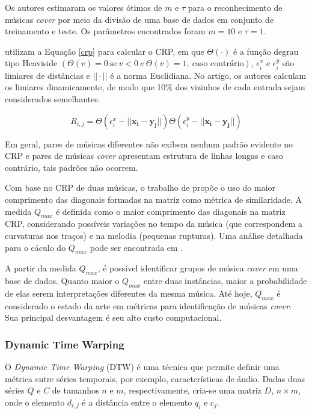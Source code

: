 Os autores estimaram os valores ótimos de \({m}\) e \({\tau}\) para o reconhecimento de músicas \textit{cover} por meio da divisão de uma base de dados em conjunto de treinamento e teste. Os parâmetros encontrados foram \({m = 10}\) e \({\tau = 1}\).

 utilizam a Equação \ref{crp} para calcular o CRP, em que \({\Theta(\cdot)}\) é a função degrau tipo Heaviside \({(\Theta(v) = 0 \ \textrm{se} \ v < 0 \  e \  \Theta(v) = 1, \ \textrm{caso contrário})}\), \({\epsilon_{i}^{x}}\) e \({\epsilon_{i}^{y}}\) são limiares de distâncias e \({|| \cdot ||}\) é a norma Euclidiana. No artigo, os autores calculam os limiares dinamicamente, de modo que 10\% dos vizinhos de cada entrada sejam considerados semelhantes.

\begin{equation} \label{crp}
    R_{i,j} = \Theta(\epsilon_{i}^{x} - ||\mathbf{x_{i} - y_{j}}||)\Theta(\epsilon_{i}^{y} - ||\mathbf{x_{i} - y_{j}}||)
\end{equation}

Em geral, pares de músicas diferentes não exibem nenhum padrão evidente no CRP e pares de músicas \textit{cover} apresentam estrutura de linhas longas e caso contrário, tais padrões não ocorrem.

Com base no CRP de duas músicas, o trabalho de  propõe o uso do maior comprimento das diagonais formadas na matriz como métrica de similaridade. A medida \({Q_{max}}\) é definida como o maior comprimento das diagonais na matriz CRP, considerando possíveis variações no tempo da música (que correspondem a curvaturas nos traços) e na melodia (pequenas rupturas). Uma análise detalhada para o cáculo do \({Q_{max}}\) pode ser encontrada em \cite{serra2009}.

A partir da medida \({Q_{max}}\), é possível identificar grupos de música \textit{cover} em uma base de dados. Quanto maior o \({Q_{max}}\) entre duas instâncias, maior a probabilidade de elas serem interpretações diferentes da mesma música. Até hoje, \({Q_{max}}\) é considerado o estado da arte em métricas para identificação de músicas \textit{cover}. Sua principal desvantagem é seu alto custo computacional.

\subsubsection{Dynamic Time Warping}

O \textit{Dynamic Time Warping} (DTW) \cite{keogh2004} é uma técnica que permite definir uma métrica entre séries temporais, por exemplo, características de áudio. Dadas duas séries \({Q}\) e \({C}\) de tamanhos \({n}\) e \({m}\), respectivamente, cria-se uma matriz \({D}\), \({n\times m}\), onde o elemento \({d_{i,j}}\) é a distância entre o elemento \({q_{i}}\) e \({c_{j}}\).

